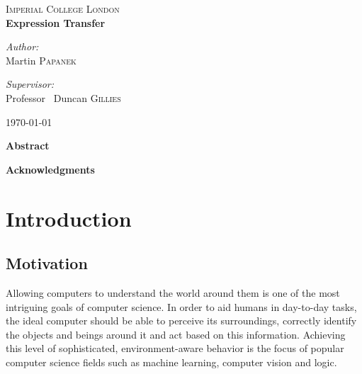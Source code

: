 \documentclass[11pt,a4paper]{report}
\begin{document}
\setcounter{secnumdepth}{3}
\setcounter{tocdepth}{3}

\makeatletter
\renewcommand*\env@matrix[1][*\c@MaxMatrixCols c]{%
  \hskip -\arraycolsep
  \let\@ifnextchar\new@ifnextchar
  \array{#1}}
\makeatother

\begin{titlepage}

\begin{center}


\textsc{\LARGE Imperial College London}\\[3.5cm]


{ \huge \bfseries Expression Transfer}\\[5.5cm]



\begin{minipage}{0.4\textwidth}
\begin{flushleft} \large
\emph{Author:}\\
Martin \textsc{Papanek}
\end{flushleft}
\end{minipage}
\begin{minipage}{0.4\textwidth}
\begin{flushright} \large
\emph{Supervisor:} \\
Professor ~Duncan \textsc{Gillies}
\end{flushright}
\end{minipage}

\vfill

{\large \today}

\end{center}

\end{titlepage}

\begin{center}
\LARGE \textbf{Abstract}
\end{center}

\newpage

\begin{center}
\LARGE \textbf{Acknowledgments}
\end{center}



\tableofcontents

\chapter{Introduction}
\section{Motivation}
Allowing computers to understand the world around them is one of the most
intriguing goals of computer science. In order to aid humans in day-to-day
tasks, the ideal computer should be able to perceive its surroundings, correctly identify the objects and beings around it and act based
on this information. Achieving this level of sophisticated, environment-aware
behavior is the focus of popular computer science fields such as machine
learning, computer vision and logic.
\end{document}
